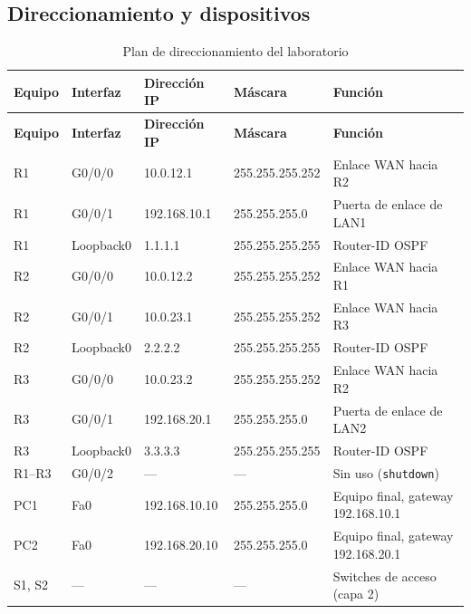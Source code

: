 \subsection{Direccionamiento y dispositivos}
\begin{longtable}{p{1.5cm}p{2.0cm}p{2.6cm}p{3.2cm}p{3.9cm}}
\caption{Plan de direccionamiento del laboratorio}\\
\toprule
\textbf{Equipo} & \textbf{Interfaz} & \textbf{Dirección IP} & \textbf{Máscara} & \textbf{Función} \\
\midrule
\endfirsthead
\toprule
\textbf{Equipo} & \textbf{Interfaz} & \textbf{Dirección IP} & \textbf{Máscara} & \textbf{Función} \\
\midrule
\endhead
R1 & G0/0/0 & 10.0.12.1 & 255.255.255.252 & Enlace WAN hacia R2 \\
R1 & G0/0/1 & 192.168.10.1 & 255.255.255.0 & Puerta de enlace de LAN1 \\
R1 & Loopback0 & 1.1.1.1 & 255.255.255.255 & Router-ID OSPF \\
R2 & G0/0/0 & 10.0.12.2 & 255.255.255.252 & Enlace WAN hacia R1 \\
R2 & G0/0/1 & 10.0.23.1 & 255.255.255.252 & Enlace WAN hacia R3 \\
R2 & Loopback0 & 2.2.2.2 & 255.255.255.255 & Router-ID OSPF \\
R3 & G0/0/0 & 10.0.23.2 & 255.255.255.252 & Enlace WAN hacia R2 \\
R3 & G0/0/1 & 192.168.20.1 & 255.255.255.0 & Puerta de enlace de LAN2 \\
R3 & Loopback0 & 3.3.3.3 & 255.255.255.255 & Router-ID OSPF \\
R1--R3 & G0/0/2 & --- & --- & Sin uso (\texttt{shutdown}) \\
PC1 & Fa0 & 192.168.10.10 & 255.255.255.0 & Equipo final, gateway 192.168.10.1 \\
PC2 & Fa0 & 192.168.20.10 & 255.255.255.0 & Equipo final, gateway 192.168.20.1 \\
S1, S2 & --- & --- & --- & Switches de acceso (capa 2) \\
\bottomrule
\end{longtable}

